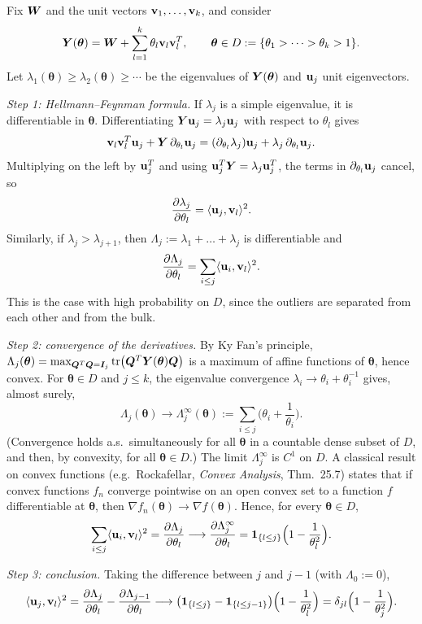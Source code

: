 \begin{remark}
Fix $\bm{W}$ and the unit vectors $\boldsymbol{\mathbf{v}}_1,\dots,\boldsymbol{\mathbf{v}}_k$, and consider
\[
\bm{Y}(\boldsymbol\theta)=\bm{W}+\sum_{l=1}^k\theta_l\boldsymbol{\mathbf{v}}_l\boldsymbol{\mathbf{v}}_l^T,
\qquad \boldsymbol\theta\in D:=\{\theta_1>\dots>\theta_k>1\}.
\]
Let $\lambda_1(\boldsymbol\theta)\ge\lambda_2(\boldsymbol\theta)\ge\cdots$ be the eigenvalues of $\bm{Y}(\boldsymbol\theta)$ and $\boldsymbol{\mathbf{u}}_j$ unit eigenvectors.

\smallskip
\noindent\emph{Step 1: Hellmann--Feynman formula.}
If $\lambda_j$ is a simple eigenvalue, it is differentiable in $\boldsymbol\theta$. Differentiating $\bm{Y}\boldsymbol{\mathbf{u}}_j=\lambda_j\boldsymbol{\mathbf{u}}_j$ with respect to $\theta_l$ gives
\[
\boldsymbol{\mathbf{v}}_l\boldsymbol{\mathbf{v}}_l^T\boldsymbol{\mathbf{u}}_j+\bm{Y}\,\partial_{\theta_l}\boldsymbol{\mathbf{u}}_j=(\partial_{\theta_l}\lambda_j)\boldsymbol{\mathbf{u}}_j+\lambda_j\,\partial_{\theta_l}\boldsymbol{\mathbf{u}}_j .
\]
Multiplying on the left by $\boldsymbol{\mathbf{u}}_j^T$ and using $\boldsymbol{\mathbf{u}}_j^T\bm{Y}=\lambda_j\boldsymbol{\mathbf{u}}_j^T$, the terms in $\partial_{\theta_l}\boldsymbol{\mathbf{u}}_j$ cancel, so
\[
\frac{\partial\lambda_j}{\partial\theta_l}=\langle\boldsymbol{\mathbf{u}}_j,\boldsymbol{\mathbf{v}}_l\rangle^2 .
\]
Similarly, if $\lambda_j>\lambda_{j+1}$, then $\Lambda_j:=\lambda_1+\dots+\lambda_j$ is differentiable and
\[
\frac{\partial\Lambda_j}{\partial\theta_l}=\sum_{i\le j}\langle\boldsymbol{\mathbf{u}}_i,\boldsymbol{\mathbf{v}}_l\rangle^2 .
\]
This is the case with high probability on $D$, since the outliers are separated from each other and from the bulk.

\smallskip
\noindent\emph{Step 2: convergence of the derivatives.}
By Ky Fan's principle, $\Lambda_j(\boldsymbol\theta)=\max_{\bm{Q}^T\bm{Q}=\bm{I}_j}\mathrm{tr}\big(\bm{Q}^T\bm{Y}(\boldsymbol\theta)\bm{Q}\big)$ is a maximum of affine functions of $\boldsymbol\theta$, hence convex. For $\boldsymbol\theta\in D$ and $j\le k$, the eigenvalue convergence $\lambda_i\to\theta_i+\theta_i^{-1}$ gives, almost surely,
\[
\Lambda_j(\boldsymbol\theta)\longrightarrow \Lambda_j^\infty(\boldsymbol\theta):=\sum_{i\le j}\Big(\theta_i+\frac1{\theta_i}\Big).
\]
(Convergence holds a.s.\ simultaneously for all $\boldsymbol\theta$ in a countable dense subset of $D$, and then, by convexity, for all $\boldsymbol\theta\in D$.)
The limit $\Lambda_j^\infty$ is $C^1$ on $D$. A classical result on convex functions (e.g.\ Rockafellar, \emph{Convex Analysis}, Thm.~25.7) states that if convex functions $f_n$ converge pointwise on an open convex set to a function $f$ differentiable at $\boldsymbol\theta$, then $\nabla f_n(\boldsymbol\theta)\to\nabla f(\boldsymbol\theta)$. Hence, for every $\boldsymbol\theta\in D$,
\[
\sum_{i\le j}\langle\boldsymbol{\mathbf{u}}_i,\boldsymbol{\mathbf{v}}_l\rangle^2=\frac{\partial\Lambda_j}{\partial\theta_l}
\longrightarrow\frac{\partial\Lambda_j^\infty}{\partial\theta_l}
=\mathbf 1_{\{l\le j\}}\Big(1-\frac1{\theta_l^2}\Big).
\]

\smallskip
\noindent\emph{Step 3: conclusion.}
Taking the difference between $j$ and $j-1$ (with $\Lambda_0:=0$),
\[
\langle\boldsymbol{\mathbf{u}}_j,\boldsymbol{\mathbf{v}}_l\rangle^2
=\frac{\partial\Lambda_j}{\partial\theta_l}-\frac{\partial\Lambda_{j-1}}{\partial\theta_l}
\longrightarrow\big(\mathbf 1_{\{l\le j\}}-\mathbf 1_{\{l\le j-1\}}\big)\Big(1-\frac1{\theta_l^2}\Big)
=\delta_{jl}\Big(1-\frac1{\theta_j^{2}}\Big).
\]
\end{remark}
